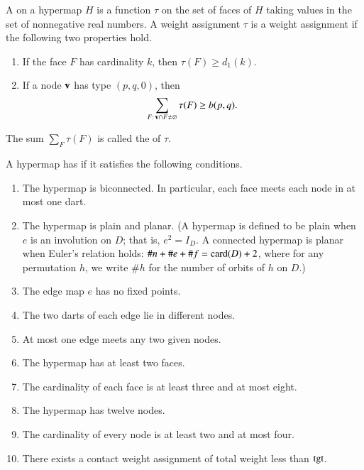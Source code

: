 \documentclass{llncs}
\def\op#1{{\hbox{#1}}}
\begin{document}
%
%
\begin{definition}
%
  A  
on a hypermap $H$ is a
  function $\tau$ on the set of faces of $H$ taking values in the set
  of nonnegative real numbers. A weight assignment $\tau$
is a 
  weight assignment if the following two properties hold.
%
\begin{enumerate}
\item If the face $F$ has cardinality $k$, then
$\tau(F) \ge d_1(k)$.
\item If a node ${\mathbf v}$ has type $(p,q,0)$, then
  \[\sum_{F:\,{\mathbf v}\cap F\ne\varnothing} \tau(F) \ge
    b{(p,q)}.\]
\end{enumerate}
The sum $\sum_F \tau(F)$ is called the  of $\tau$.
\end{definition}
%

\begin{definition}
  A hypermap has  if it satisfies the following 
  conditions.
%
%
%
%
%
%
%
%
%
\begin{enumerate}
\item {} The hypermap is biconnected.  In particular,
  each face meets each node in at most one dart.
\item {} The hypermap is plain and planar.  (A hypermap is defined
to be plain when $e$ is an involution on $D$; that is, $e^2 = I_D$. A connected hypermap
is planar when Euler's relation holds: $\#n + \#e + \#f = \card(D) + 2$, where 
for any permutation $h$, we write $\#h$ for
the number of orbits of $h$ on $D$.)
\item {} The edge map $e$ has no fixed points.
\item {} The two darts of each edge lie in different
  nodes.
\item {} At most one edge meets any two given
  nodes.
\item {} The hypermap has at least two faces.
\item {} The cardinality of each face is at least three
  and at most eight.
\item {} The hypermap has twelve nodes.
\item {} The cardinality of every node is at least two  and at most four.
\item {} There exists a contact weight assignment of total
  weight less than $\op{tgt}$.
\end{enumerate}
%
\end{definition}
\end{document}
